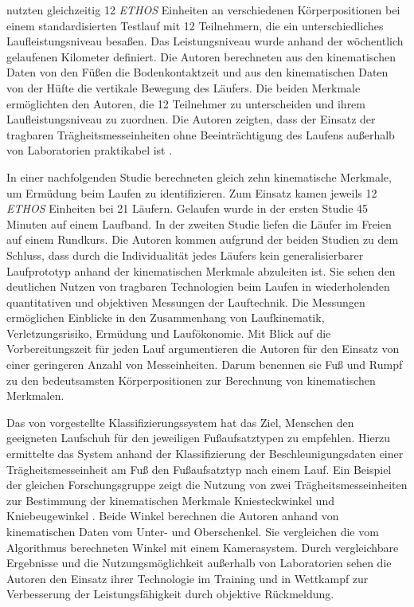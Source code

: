 \citet{Strohrmann2011} nutzten gleichzeitig 12 \emph{ETHOS} Einheiten an verschiedenen Körperpositionen bei einem standardisierten Testlauf mit 12 Teilnehmern, die ein unterschiedliches Laufleistungsniveau besaßen. Das Leistungsniveau wurde anhand der wöchentlich gelaufenen Kilometer definiert. Die Autoren berechneten aus den kinematischen Daten von den Füßen die Bodenkontaktzeit und aus den kinematischen Daten von der Hüfte die vertikale Bewegung des Läufers. Die beiden Merkmale ermöglichten den Autoren, die 12 Teilnehmer zu unterscheiden und ihrem Laufleistungsniveau zu zuordnen. Die Autoren zeigten, dass der Einsatz der tragbaren Trägheitsmesseinheiten ohne Beeinträchtigung des Laufens außerhalb von Laboratorien praktikabel ist \citep[vgl.][]{Strohrmann2011a}.

In einer nachfolgenden Studie berechneten \citet{Strohrmann2012} gleich zehn kinematische Merkmale, um Ermüdung beim Laufen zu identifizieren. Zum Einsatz kamen jeweils 12 \emph{ETHOS} Einheiten bei 21 Läufern. Gelaufen wurde in der ersten Studie 45 Minuten auf einem Laufband. In der zweiten Studie liefen die Läufer im Freien auf einem Rundkurs. Die Autoren kommen aufgrund der beiden Studien zu dem Schluss, dass durch die Individualität jedes Läufers kein generalisierbarer Laufprototyp anhand der kinematischen Merkmale abzuleiten ist. Sie sehen den deutlichen Nutzen von tragbaren Technologien beim Laufen in wiederholenden quantitativen und objektiven Messungen der Lauftechnik. Die Messungen ermöglichen Einblicke in den Zusammenhang von Laufkinematik, Verletzungsrisiko, Ermüdung und Laufökonomie. Mit Blick auf die Vorbereitungszeit für jeden Lauf argumentieren die Autoren für den Einsatz von einer geringeren Anzahl von Messeinheiten. Darum benennen sie Fuß und Rumpf zu den bedeutsamsten Körperpositionen zur Berechnung von kinematischen Merkmalen.

Das von \citet{Eskofier2013} vorgestellte Klassifizierungssystem hat das Ziel, Menschen den geeigneten Laufschuh für den jeweiligen Fußaufsatztypen zu empfehlen. Hierzu ermittelte das System anhand der Klassifizierung der Beschleunigungsdaten einer Trägheitsmesseinheit am Fuß den Fußaufsatztyp nach einem Lauf. Ein Beispiel der gleichen Forschungsgruppe zeigt die Nutzung von zwei Trägheitsmesseinheiten zur Bestimmung der kinematischen Merkmale Kniesteckwinkel und Kniebeugewinkel \citep[vgl.][]{Jakob2013}. Beide Winkel berechnen die Autoren anhand von kinematischen Daten vom Unter- und Oberschenkel. Sie vergleichen die vom Algorithmus berechneten Winkel mit einem Kamerasystem. Durch vergleichbare Ergebnisse und die Nutzungsmöglichkeit außerhalb von Laboratorien sehen die Autoren den Einsatz ihrer Technologie im Training und in Wettkampf zur Verbesserung der Leistungsfähigkeit durch objektive Rückmeldung.

